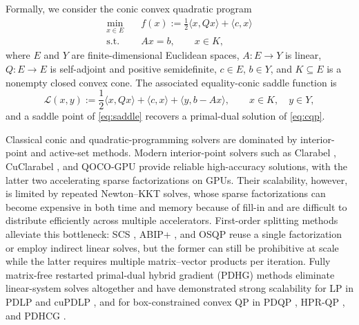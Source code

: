 \documentclass[letterpaper]{article} %
\theoremstyle{definition}
\theoremstyle{remark}
\begin{document}
Formally, we consider the conic convex quadratic program
\begin{equation}
\label{eq:cqp}
\begin{aligned}
    \min_{x\in E}\quad
    & f(x):=\frac12\langle x,Qx\rangle+\langle c,x\rangle\\
    \mathrm{s.t.}\quad
    & Ax=b,\qquad x\in K,
\end{aligned}
\end{equation}
where $E$ and $Y$ are finite-dimensional Euclidean spaces,
$A:E\to Y$ is linear, $Q:E\to E$ is self-adjoint and positive semidefinite,
$c\in E$, $b\in Y$, and $K\subseteq E$ is a nonempty closed convex cone.  The
associated equality-conic saddle function is
\begin{equation}
\label{eq:saddle}
    \mathcal L(x,y)
    :=
    \frac12\langle x,Qx\rangle+\langle c,x\rangle
    +\langle y,b-Ax\rangle,
    \qquad x\in K,\quad y\in Y,
\end{equation}
and a saddle point of \eqref{eq:saddle} recovers a primal-dual solution of
\eqref{eq:cqp}.

Classical conic and quadratic-programming solvers are dominated by interior-point and active-set methods. Modern interior-point solvers such as Clarabel \cite{goulart2024clarabel}, CuClarabel \cite{chen2024cuclarabel}, and QOCO-GPU \cite{chari2026qocogpu} provide reliable high-accuracy solutions, with the latter two accelerating sparse factorizations on GPUs. Their scalability, however, is limited by repeated Newton--KKT solves, whose sparse factorizations can become expensive in both time and memory because of fill-in and are difficult to distribute efficiently across multiple accelerators. First-order splitting methods alleviate this bottleneck: SCS \cite{o2016conic,scs}, ABIP+ \cite{lin2021admm,deng2025enhanced}, and OSQP \cite{stellato2020osqp} reuse a single factorization or employ indirect linear solves, but the former can still be prohibitive at scale while the latter requires multiple matrix--vector products per iteration. Fully matrix-free restarted primal-dual hybrid gradient (PDHG) methods eliminate linear-system solves altogether and have demonstrated strong scalability for LP in PDLP \cite{applegate2021practical} and cuPDLP \cite{lu2023cupdlpc}, and for box-constrained convex QP in PDQP \cite{lu2023practical}, HPR-QP \cite{chen2025hpr}, and PDHCG \cite{huang2025restarted}.
\end{document}
